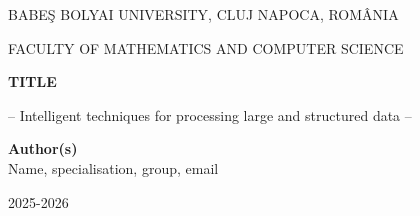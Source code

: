 \documentclass[runningheads,a4paper,11pt]{report}
\begin{document}
\begin{titlepage}
\sloppy

\begin{center}
BABE\c S BOLYAI UNIVERSITY, CLUJ NAPOCA, ROM\^ ANIA

FACULTY OF MATHEMATICS AND COMPUTER SCIENCE

\vspace{6cm}

\Huge \textbf{TITLE}

\vspace{1cm}

\normalsize -- Intelligent techniques for processing large and structured data --

\end{center}


\vspace{5cm}

\begin{flushright}
\Large{\textbf{Author(s)}}\\
Name, specialisation, group, email
\end{flushright}

\vspace{4cm}

\begin{center}
2025-2026
\end{center}

\end{titlepage}


\begin{abstract}
	Text of abstract. Short info about: 
	\begin{itemize}
		\item project relevance/importance, 
		\item inteligent methods used for solving, 
		\item data involved in the numerical experiments; 
		\item conclude by the the results obtained.
		\item Please add a graphical abstract of your work. 
	\end{itemize}

	

\noindent
\textbf{\textcolor{green}{Remind that a good report should:}}
\begin{itemize}	
	\item be fun to read with many figures and visualizations;
	\item be easy to follow even for AI/ML novice;
	\item clearly convey the potential of AI/ML to the application domain;
	\item around 10 minutes to read (although this is not a hard constraint).
\end{itemize}

\end{abstract}
\end{document}
